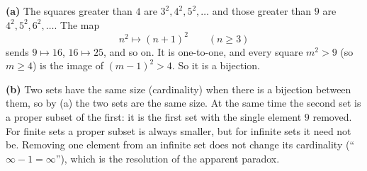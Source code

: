 \textbf{(a)} The squares greater than $4$ are $3^2,4^2,5^2,\dots$ and those greater than $9$ are $4^2,5^2,6^2,\dots$. The map
\[n^2\longmapsto(n+1)^2\qquad(n\ge3)\]
sends $9\mapsto16$, $16\mapsto25$, and so on. It is one-to-one, and every square $m^2>9$ (so $m\ge4$) is the image of $(m-1)^2>4$. So it is a bijection.

\textbf{(b)} Two sets have the same size (cardinality) when there is a bijection between them, so by (a) the two sets are the same size. At the same time the second set is a proper subset of the first: it is the first set with the single element $9$ removed. For finite sets a proper subset is always smaller, but for infinite sets it need not be. Removing one element from an infinite set does not change its cardinality (``$\infty-1=\infty$''), which is the resolution of the apparent paradox.
